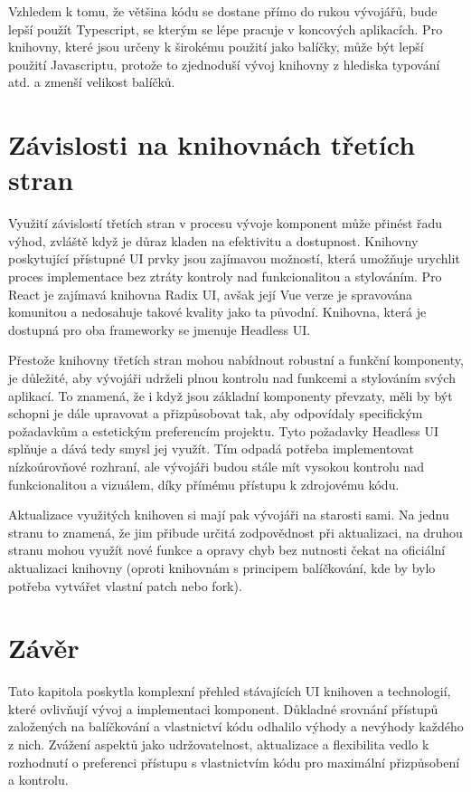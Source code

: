 Vzhledem k tomu, že většina kódu se dostane přímo do rukou vývojářů, bude lepší použít Typescript, se kterým se lépe pracuje v koncových aplikacích. Pro knihovny, které jsou určeny k širokému použití jako balíčky, může být lepší použití Javascriptu, protože to zjednoduší vývoj knihovny z hlediska typování atd. a zmenší velikost balíčků.


\section{Závislosti na knihovnách třetích stran}
Využití závislostí třetích stran v procesu vývoje komponent může přinést řadu výhod, zvláště když je důraz kladen na efektivitu a dostupnost. Knihovny poskytující přístupné UI prvky jsou zajímavou možností, která umožňuje urychlit proces implementace bez ztráty kontroly nad funkcionalitou a stylováním. Pro React je zajímavá knihovna Radix UI, avšak její Vue verze je spravována komunitou a nedosahuje takové kvality jako ta původní. Knihovna, která je dostupná pro oba frameworky se jmenuje Headless UI.

Přestože knihovny třetích stran mohou nabídnout robustní a funkční komponenty, je důležité, aby vývojáři udrželi plnou kontrolu nad funkcemi a stylováním svých aplikací. To znamená, že i když jsou základní komponenty převzaty, měli by být schopni je dále upravovat a přizpůsobovat tak, aby odpovídaly specifickým požadavkům a estetickým preferencím projektu. Tyto požadavky Headless UI splňuje a dává tedy smysl jej využít. Tím odpadá potřeba implementovat nízkoúrovňové rozhraní, ale vývojáři budou stále mít vysokou kontrolu nad funkcionalitou a vizuálem, díky přímému přístupu k zdrojovému kódu.

Aktualizace využitých knihoven si mají pak vývojáři na starosti sami. Na jednu stranu to znamená, že jim přibude určitá zodpovědnost při aktualizaci, na druhou stranu mohou využít nové funkce a opravy chyb bez nutnosti čekat na oficiální aktualizaci knihovny (oproti knihovnám s principem balíčkování, kde by bylo potřeba vytvářet vlastní patch nebo fork).

\section{Závěr}
Tato kapitola poskytla komplexní přehled stávajících UI knihoven a technologií, které ovlivňují vývoj a implementaci komponent. Důkladné srovnání přístupů založených na balíčkování a vlastnictví kódu odhalilo výhody a nevýhody každého z nich. Zvážení aspektů jako udržovatelnost, aktualizace a flexibilita vedlo k rozhodnutí o preferenci přístupu s vlastnictvím kódu pro maximální přizpůsobení a kontrolu.

